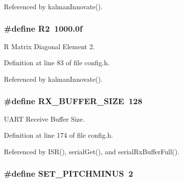 Referenced by kalman\-Innovate().

\hypertarget{group__config_ga7a255a2815b9453060f51c6eb22cfed8}{
\subsubsection[{R2}]{\setlength{\rightskip}{0pt plus 5cm}\#define R2~1000.\-0f}}\label{group__config_ga7a255a2815b9453060f51c6eb22cfed8}


R Matrix Diagonal Element 2. 



Definition at line 83 of file config.\-h.



Referenced by kalman\-Innovate().

\hypertarget{group__config_ga739a2a1a0047c98ac1b18ecd25dac092}{
\subsubsection[{R\-X\-\_\-\-B\-U\-F\-F\-E\-R\-\_\-\-S\-I\-Z\-E}]{\setlength{\rightskip}{0pt plus 5cm}\#define R\-X\-\_\-\-B\-U\-F\-F\-E\-R\-\_\-\-S\-I\-Z\-E~128}}\label{group__config_ga739a2a1a0047c98ac1b18ecd25dac092}


U\-A\-R\-T Receive Buffer Size. 



Definition at line 174 of file config.\-h.



Referenced by I\-S\-R(), serial\-Get(), and serial\-Rx\-Buffer\-Full().

\hypertarget{group__config_ga8c969dbb07dc504226fc2c69484b9768}{
\subsubsection[{S\-E\-T\-\_\-\-P\-I\-T\-C\-H\-M\-I\-N\-U\-S}]{\setlength{\rightskip}{0pt plus 5cm}\#define S\-E\-T\-\_\-\-P\-I\-T\-C\-H\-M\-I\-N\-U\-S~2}}\label{group__config_ga8c969dbb07dc504226fc2c69484b9768}



